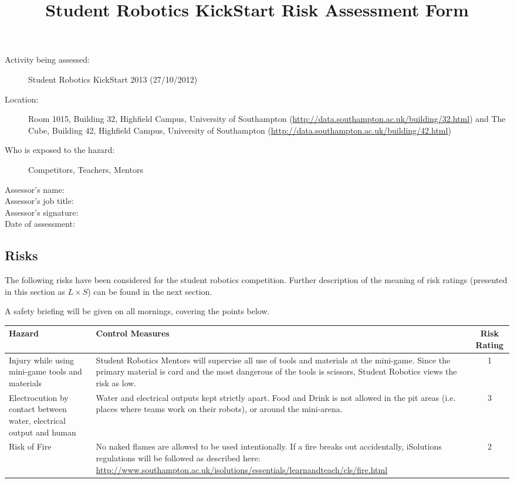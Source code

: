 \documentclass[12pt,a4paper]{scrartcl}
\title{Student Robotics KickStart Risk Assessment Form}
\begin{document}
\maketitle

\begin{description}
\item[Activity being assessed:] Student Robotics KickStart 2013 (27/10/2012)
\item[Location:] Room 1015, Building 32, Highfield Campus, University of Southampton (\url{http://data.southampton.ac.uk/building/32.html}) and The Cube, Building 42, Highfield Campus, University of Southampton (\url{http://data.southampton.ac.uk/building/42.html})
\item[Who is exposed to the hazard:] Competitors, Teachers, Mentors
\end{description}

\begin{description}
\item[Assessor's name:]
\item[Assessor's job title:]
\item[Assessor's signature:]
\item[Date of assessment:]
\end{description}
\clearpage

\newcommand{\risk}[3]{
 #1 & #2 & #3 \\
}

\begin{landscape}
\section{Risks}
The following risks have been considered for the student robotics competition.  Further description of the meaning of risk ratings (presented in this section as $L \times S$) can be found in the next section.

A safety briefing will be given on all mornings, covering the points below.

\bigskip
\begin{tabular*}{\linewidth}[c]{p{14em}p{30em}c}
\toprule
\textbf{Hazard} & \textbf{Control Measures} & \textbf{Risk Rating} \\
\midrule

\risk{Injury while using mini-game tools and materials}
{Student Robotics Mentors will supervise all use of tools and materials at the mini-game. Since the primary material is card and the most dangerous of the tools is scissors, Student Robotics views the risk as low.}
{1}

\risk{Electrocution by contact between water, electrical output and human}
{Water and electrical outputs kept strictly apart. Food and Drink is not allowed in the pit areas (i.e. places where teams work on their robots), or around the mini-arena.}
{3}

\risk{Risk of Fire}
{No naked flames are allowed to be used intentionally. If a fire breaks out accidentally, iSolutions regulations will be followed as described here: \url{http://www.southampton.ac.uk/isolutions/essentials/learnandteach/cls/fire.html}}
{2}
\bottomrule
\end{tabular*}
\end{landscape}
\end{document}
